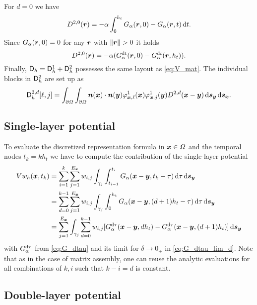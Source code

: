 \documentclass[a4paper,11pt]{article}
\begin{document}
For $d=0$ we have
\begin{equation*}
  D^{2,0}({{\bm{r}}}) = -\alpha \int_0^{h_t} G_\alpha({{\bm{r}}},0) - G_\alpha({{\bm{r}}}, t) \,{\mathrm{d}} t.
\end{equation*}
Since $G_\alpha({{\bm{r}}},0) = 0$ for any ${{\bm{r}}}$ with $\| \vr\|>0$ it holds
\begin{equation*}
  D^{2,0}({{\bm{r}}}) = -\alpha ( G_\alpha^{{\mathrm{d}} t}( {{\bm{r}}}, 0 ) - G_\alpha^{{\mathrm{d}} t}({{\bm{r}}}, h_t ) ).
\end{equation*}
Finally, ${{\mathsf{D}}}_h = {{\mathsf{D}}}_h^1 + {{\mathsf{D}}}_h^2$ possesses the same layout as \eqref{eq:V_mat}. The individual blocks in ${{\mathsf{D}}}_h^2$ are set up as
\begin{equation*}
  {\ensuremath{{\mathsf{D}}}}^{2,d}_h[ \ell , j ] = \int_{\partial\Omega} \int_{\partial\Omega} {{\bm{n}}}({{\bm{x}}}) \cdot {\ensuremath{{\bm{n}}}}({{\bm{y}}}) \varphi^1_{{{\bm{x}}},\ell}({{\bm{x}}}) \varphi^1_{{{\bm{x}}},j}({{\bm{y}}}) D^{2,d}({{\bm{x}}}-{{\bm{y}}}) \,{\mathrm{d}}{{\bm{s}}}_{{\bm{y}}} \,{\mathrm{d}}{{\bm{s}}}_{{\bm{x}}}.
\end{equation*}

\subsection{Single-layer potential}

To evaluate the discretized representation formula in ${{\bm{x}}}\in\Omega$ and the temporal nodes $t_k = k h_t$ we have to compute the contribution of the single-layer potential
\begin{align*}
 Vw_h({{\bm{x}}}, t_k) &= \sum_{i=1}^{k} \sum_{j=1}^{E_{{\bm{x}}}} w_{i,j} \int_{\gamma_j} \int_{t_{i-1}}^{t_i} G_\alpha({{\bm{x}}}-{{\bm{y}}},t_k-\tau) \,{\mathrm{d}}\tau \,{\mathrm{d}}{{\bm{s}}}_{{\bm{y}}} \\
 &= \sum_{d=0}^{k-1} \sum_{j=1}^{E_{{\bm{x}}}} w_{i,j} \int_{\gamma_j} \int_{0}^{h_t} G_\alpha({{\bm{x}}}-{{\bm{y}}},(d+1)h_t-\tau) \,{\mathrm{d}}\tau \,{\mathrm{d}}{{\bm{s}}}_{{\bm{y}}} \\
  &= \sum_{j=1}^{E_{{\bm{x}}}} \int_{\gamma_j} \sum_{d=0}^{k-1} w_{i,j} [ G_\alpha^{{\mathrm{d}}\tau}({{\bm{x}}}-{{\bm{y}}}, dh_t) - G_\alpha^{{\mathrm{d}}\tau}({{\bm{x}}}-{{\bm{y}}}, (d+1)h_t) ] \,{\mathrm{d}}{{\bm{s}}}_{{\bm{y}}}
\end{align*}
with $G_\alpha^{{\mathrm{d}}\tau}$ from \eqref{eq:G_dtau} and its limit for $\delta \to 0_+$ in \eqref{eq:G_dtau_lim_d}. Note that as in the case of matrix assembly, one can reuse the analytic evaluations for all combinations of $k,i$ such that $k-i=d$ is constant.

\subsection{Double-layer potential}
\end{document}

